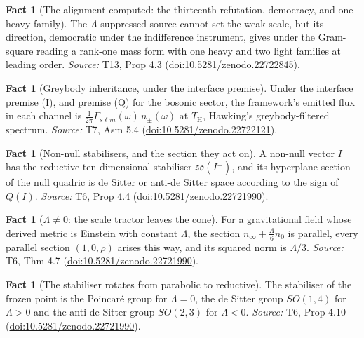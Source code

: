 \documentclass[11pt]{article}
\theoremstyle{definition}
\newtheorem{fact}[theorem]{Fact}
\theoremstyle{plain}
\providecommand{\TH}{}\renewcommand{\TH}{T_{\mathrm{H}}}
\providecommand{\nInf}{}\renewcommand{\nInf}{n_\infty}
\providecommand{\nO}{}\renewcommand{\nO}{n_0}
\begin{document}
\begin{fact}[The alignment computed: the thirteenth refutation, democracy, and one heavy family]\label{c:families.alignment-computed-thirteenth-refutation-democracy-one}
The $\Lambda$-suppressed source cannot set the weak scale, but its direction, democratic under the indifference instrument, gives under the Gram-square reading a rank-one mass form with one heavy and two light families at leading order.
\emph{Source:} T13, Prop 4.3 (\href{https://doi.org/10.5281/zenodo.22722845}{doi:10.5281/zenodo.22722845}).
\end{fact}

\begin{fact}[Greybody inheritance, under the interface premise]\label{c:hawking.greybody-inheritance-under-interface-premise}
Under the interface premise (I), and premise (Q) for the bosonic sector, the framework's emitted flux in each channel is $\tfrac{1}{2\pi}\Gamma_{s\ell m}(\omega)\,n_{\pm}(\omega)$ at $\TH$, Hawking's greybody-filtered spectrum.
\emph{Source:} T7, Asm 5.4 (\href{https://doi.org/10.5281/zenodo.22722121}{doi:10.5281/zenodo.22722121}).
\end{fact}

\begin{fact}[Non-null stabilisers, and the section they act on]\label{c:interior.non-null-stabilisers-section-they-act}
A non-null vector $I$ has the reductive ten-dimensional stabiliser $\mathfrak{so}(I^\perp)$, and its hyperplane section of the null quadric is de Sitter or anti-de Sitter space according to the sign of $Q(I)$.
\emph{Source:} T6, Prop 4.4 (\href{https://doi.org/10.5281/zenodo.22721990}{doi:10.5281/zenodo.22721990}).
\end{fact}

\begin{fact}[$\Lambda \neq 0$: the scale tractor leaves the cone]\label{c:interior.scale-tractor-leaves-cone}
For a gravitational field whose derived metric is Einstein with constant $\Lambda$, the section $\nInf + \tfrac{\Lambda}{6}\nO$ is parallel, every parallel section $(1, 0, \rho)$ arises this way, and its squared norm is $\Lambda/3$.
\emph{Source:} T6, Thm 4.7 (\href{https://doi.org/10.5281/zenodo.22721990}{doi:10.5281/zenodo.22721990}).
\end{fact}

\begin{fact}[The stabiliser rotates from parabolic to reductive]\label{c:interior.stabiliser-rotates-parabolic-reductive}
The stabiliser of the frozen point is the Poincar\'e group for $\Lambda = 0$, the de Sitter group $SO(1,4)$ for $\Lambda > 0$ and the anti-de Sitter group $SO(2,3)$ for $\Lambda < 0$.
\emph{Source:} T6, Prop 4.10 (\href{https://doi.org/10.5281/zenodo.22721990}{doi:10.5281/zenodo.22721990}).
\end{fact}
\end{document}
